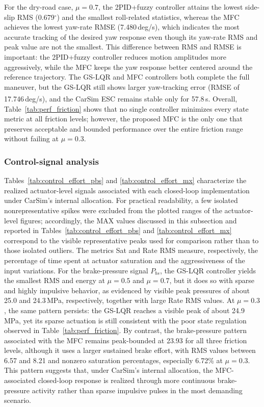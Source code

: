 \documentclass[sn-chicago,iicol]{sn-jnl}
\theoremstyle{thmstyleone}%
\theoremstyle{thmstyletwo}%
\theoremstyle{thmstylethree}%
\begin{document}
For the dry-road case, $\mu = 0.7$, the 2PID+fuzzy controller attains the lowest side-slip RMS (0.679$^\circ$) and the smallest roll-related statistics, whereas the MFC achieves the lowest yaw-rate RMSE (7.480\,deg/s), which indicates the most accurate tracking of the desired yaw response even though its yaw-rate RMS and peak value are not the smallest. This difference between RMS and RMSE is important: the 2PID+fuzzy controller reduces motion amplitudes more aggressively, while the MFC keeps the yaw response better centered around the reference trajectory. The GS-LQR and MFC controllers both complete the full maneuver, but the GS-LQR still shows larger yaw-tracking error (RMSE of 17.746\,deg/s), and the CarSim\textsuperscript{\textregistered} ESC remains stable only for 57.8\,s. Overall, Table~\ref{tab:perf_friction} shows that no single controller minimizes every state metric at all friction levels; however, the proposed MFC is the only one that preserves acceptable and bounded performance over the entire friction range without failing at $\mu = 0.3$.

\subsubsection{Control-signal analysis}

Tables~\ref{tab:control_effort_pbs} and \ref{tab:control_effort_mx} characterize the realized actuator-level signals associated with each closed-loop implementation under CarSim's internal allocation. For practical readability, a few isolated nonrepresentative spikes were excluded from the plotted ranges of the actuator-level figures; accordingly, the MAX values discussed in this subsection and reported in Tables~\ref{tab:control_effort_pbs} and \ref{tab:control_effort_mx} correspond to the visible representative peaks used for comparison rather than to those isolated outliers. The metrics Sat and Rate RMS measure, respectively, the percentage of time spent at actuator saturation and the aggressiveness of the input variations. For the brake-pressure signal $P_{bs}$, the GS-LQR controller yields the smallest RMS and energy at $\mu = 0.5$ and $\mu = 0.7$, but it does so with sparse and highly impulsive behavior, as evidenced by visible peak pressures of about 25.0 and 24.3\,MPa, respectively, together with large Rate RMS values. At $\mu = 0.3$, the same pattern persists: the GS-LQR reaches a visible peak of about 24.9\,MPa, yet its sparse actuation is still consistent with the poor state regulation observed in Table~\ref{tab:perf_friction}. By contrast, the brake-pressure pattern associated with the MFC remains peak-bounded at 23.93 for all three friction levels, although it uses a larger sustained brake effort, with RMS values between 6.57 and 8.21 and nonzero saturation percentages, especially 6.72\% at $\mu = 0.3$. This pattern suggests that, under CarSim's internal allocation, the MFC-associated closed-loop response is realized through more continuous brake-pressure activity rather than sparse impulsive pulses in the most demanding scenario.
\end{document}
